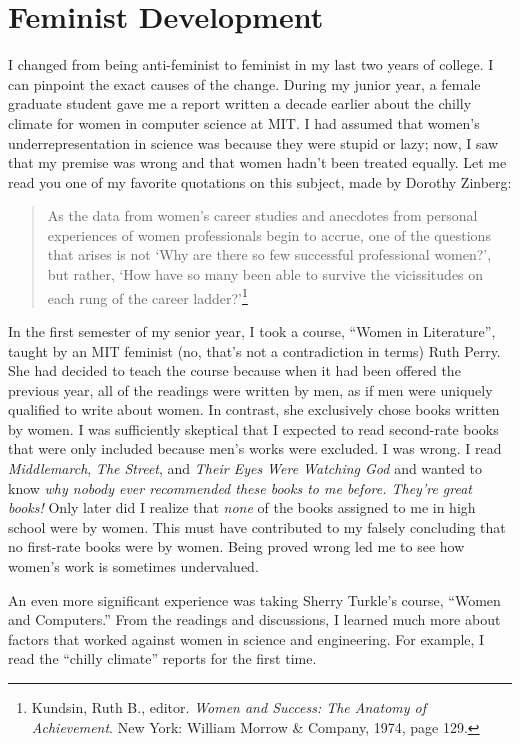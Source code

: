 \section{Feminist Development}

I changed from being anti-feminist to feminist in my last two years of
college.  I can pinpoint the exact causes of the change.  During my
junior year, a female graduate student gave me a report written a
decade earlier about the chilly climate for women in computer science
at MIT.  I had assumed that women's underrepresentation in science was
because they were stupid or lazy; now, I saw that my premise was wrong
and that women hadn't been treated equally.  Let me read you one of my
favorite quotations on this subject, made by Dorothy Zinberg:
\begin{quotation}
As the data from women's career studies and anecdotes from personal
experiences of women professionals begin to accrue, one of the
questions that arises is not `Why are there so few successful
professional women?', but rather, `How have so many been able to
survive the vicissitudes on each rung of the career
ladder?'\footnote{Kundsin, Ruth B., editor.  {\it Women and Success:
The Anatomy of Achievement}.  New York: William Morrow \& Company,
1974, page 129.} 
\end{quotation}

In the first semester of my senior year, I took a course, ``Women in
Literature'', taught by an MIT feminist (no, that's not a
contradiction in terms) Ruth Perry.  She had decided to teach the
course because when it had been offered the previous year, all of the
readings were written by men, as if men were uniquely qualified to
write about women.  In contrast, she exclusively chose books written
by women.  I was sufficiently skeptical that I expected to read
second-rate books that were only included because men's works were
excluded.  I was wrong.  I read {\it Middlemarch}, {\it The Street},
and {\it Their Eyes Were Watching God} and wanted to know {\it why
nobody ever recommended these books to me before.  They're great
books!} Only later did I realize that {\it none\/} of the books
assigned to me in high school were by women.  This must have
contributed to my falsely concluding that no first-rate books were by
women.  Being proved wrong led me to see how women's work is sometimes
undervalued.

An even more significant experience was taking Sherry Turkle's course,
``Women and Computers.''  From the readings and discussions, I learned
much more about factors that worked against women in science and
engineering.  For example, I read the ``chilly climate'' reports for
the first time.

